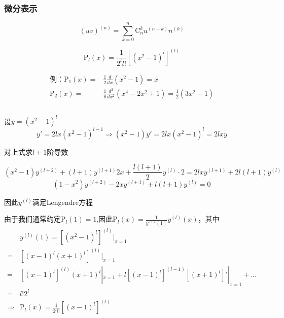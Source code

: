 \subsubsection{微分表示}

\begin{thm}
    $$
    (uv)^{(n)}=\sum_{k=0}^n\mathrm{C}_n^ku^{(n-k)}n^{(k)}
    $$
\end{thm}

$$\boxed{\mathrm{P}_l(x)=\frac{1}{2^ll!}[(x^2-1)^l]^{(l)}}$$

$$
\begin{aligned}
\mbox{例：}\mathrm{P}_1(x)=&\frac{1}{2}\frac{d}{dx}(x^2-1)=x\\
\mathrm{P}_2(x)=&\frac{1}{8}\frac{d^2}{dx^2}(x^4-2x^2+1)=\frac{1}{2}(3x^2-1)
\end{aligned}
$$

\begin{prf}
$$$$

设$y=(x^2-1)^l$
$$y'=2lx(x^2-1)^{l-1}\Rightarrow(x^2-1)y'=2lx(x^2-1)^l=2lxy$$

对上式求$l+1$阶导数

$$
(x^2-1)y^{(l+2)}+(l+1)y^{(l+1)}2x+\frac{l(l+1)}{2}y^{(l)}\cdot2=2lxy^{(l+1)}+2l(l+1)y^{(l)}
$$
$$(1-x^2)y^{(l+2)}-2xy^{(l+1)}+l(l+1)y^{(l)}=0$$

因此$y^{(l)}$满足Lengendre方程
\end{prf}

由于我们通常约定$\mathrm{P}_l(1)=1$,因此$\mathrm{P}_l(x)=\frac{1}{y^{(l)}(1)}y^{(l)}(x)$，其中
$$
\begin{aligned}
&y^{(l)}(1)=[(x^2-1)^l]^{(l)}|_{x=1}\\
=&[(x-1)^l(x+1)^l]^{(l)}|_{x=1}\\
=&[(x-1)^l]^{(l)}(x+1)^l|_{x=1}+l[(x-1)^l]^{(l-1)}[(x+1)^l]'|_{x=1}+...\\
=&l!2^l\\
\Rightarrow&\mathrm{P}_l(x)=\frac{1}{2^ll!}[(x-1)^l]^{(l)}
\end{aligned}
$$

